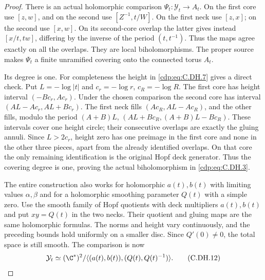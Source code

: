\begin{proof}
There is an actual
holomorphic comparison
$\Psi_t:\mathcal Y_t\to A_t$.
On the first core use
$[z,w]$, and on the
second use $[Z^{-1},t/W]$.
On the first neck use
$[z,x]$; on the second
use $[x,w]$. On its
second-core overlap
the latter gives instead
$[x/t,tw]$, differing by
the inverse of the period
$(t,t^{-1})$. Thus the
maps agree exactly on
all the overlaps. They
are local biholomorphisms.
The proper source makes
$\Psi_t$ a finite
unramified covering
onto the connected
torus $A_t$.

Its degree is one.
For completeness the
height in \eqref{cdp:eq:C.DH.7}
gives a direct check.
Put $L=-\log|t|$ and
$c_r=-\log r$, $c_R=-\log R$.
The first core has
height interval
$(-Bc_r,Ac_r)$.
Under the chosen comparison
the second core has interval
$(AL-Ac_r,AL+Bc_r)$.
The first neck fills
$(Ac_R,AL-Ac_R)$,
and the other fills,
modulo the period
$(A+B)L$,
$(AL+Bc_R,(A+B)L-Bc_R)$.
These intervals cover
one height circle;
their consecutive
overlaps are exactly
the gluing annuli.
Since $L>2c_r$,
height zero has one
preimage in the first
core and none in the
other three pieces,
apart from the already
identified overlaps.
On that core the only
remaining identification
is the original Hopf
deck generator. Thus
the covering degree
is one, proving the
actual biholomorphism
in \eqref{cdp:eq:C.DH.3}.

The entire construction
also works for holomorphic
$a(t),b(t)$ with limiting
values $\alpha,\beta$
and for a holomorphic
smoothing parameter $Q(t)$
with a simple zero.
Use the smooth family
of Hopf quotients with
deck multipliers $a(t),b(t)$
and put $xy=Q(t)$ in
the two necks. Their
quotient and gluing maps
are the same holomorphic
formulas. The norms and
height vary continuously,
and the preceding bounds
hold uniformly on a
smaller disc. Since
$Q'(0)\ne0$, the total
space is still smooth.
The comparison is now
\[
 \mathcal Y_t\simeq
 (\C^*)^2/
       \langle(a(t),b(t)),(Q(t),Q(t)^{-1})\rangle.
                                                               \tag{C.DH.12}\label{cdp:eq:C.DH.12}
\]


\end{proof}

